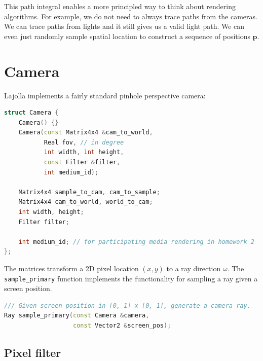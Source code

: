 This path integral enables a more principled way to think about rendering algorithms. For example, we do not need to always trace paths from the cameras. We can trace paths from lights and it still gives us a valid light path. We can even just randomly sample spatial location to construct a sequence of positions $\mathbf{p}$.

\section{Camera}

Lajolla implements a fairly standard pinhole perspective camera:
\begin{lstlisting}[language=c++]
struct Camera {
    Camera() {}
    Camera(const Matrix4x4 &cam_to_world,
           Real fov, // in degree
           int width, int height,
           const Filter &filter,
           int medium_id);

    Matrix4x4 sample_to_cam, cam_to_sample;
    Matrix4x4 cam_to_world, world_to_cam;
    int width, height;
    Filter filter;

    int medium_id; // for participating media rendering in homework 2
};
\end{lstlisting}
The matrices transform a 2D pixel location $(x, y)$ to a ray direction $\omega$. The \lstinline{sample_primary} function implements the functionality for sampling a ray given a screen position.
\begin{lstlisting}[language=c++]
/// Given screen position in [0, 1] x [0, 1], generate a camera ray.
Ray sample_primary(const Camera &camera,
                   const Vector2 &screen_pos);
\end{lstlisting}

\subsection{Pixel filter}
\label{sec:pixel_filter}

